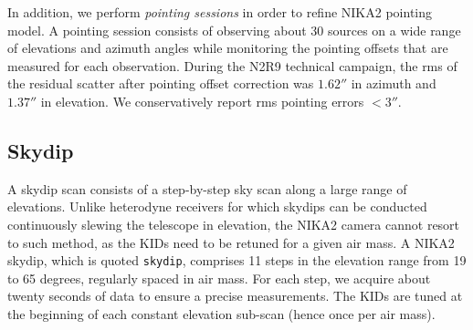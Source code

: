 \documentclass[traditionalabstract]{aa}
\newcommand{\airmass}{air mass}
\newcommand{\lp}[1]{#1}
\begin{document}
{\lp In addition, we perform \emph{pointing sessions} in order to
refine NIKA2 pointing model. A pointing session consists of observing
about 30 sources on a wide range of elevations and azimuth angles while
monitoring the pointing offsets that are measured for each
observation. During the N2R9 technical campaign, the rms of
the residual scatter after pointing offset correction was $1.62''$ in
azimuth and $1.37''$ in elevation. We conservatively report rms pointing errors $<3''$.}

\subsection{Skydip}
\label{se:skydip}

A skydip scan consists of a step-by-step sky scan along a large range
of elevations. Unlike heterodyne receivers for which skydips can be
conducted continuously slewing the telescope in elevation, the NIKA2
camera cannot resort to such method, as the KIDs need to be retuned
for a given \airmass. A NIKA2 skydip, which is quoted {\tt skydip},
comprises 11 steps in the elevation range from 19 to 65 degrees,
regularly spaced in \airmass. For each step, we acquire about twenty
seconds of data to ensure a precise measurements. The KIDs are tuned at
the beginning of each constant elevation sub-scan (hence once per
\airmass).
\end{document}
